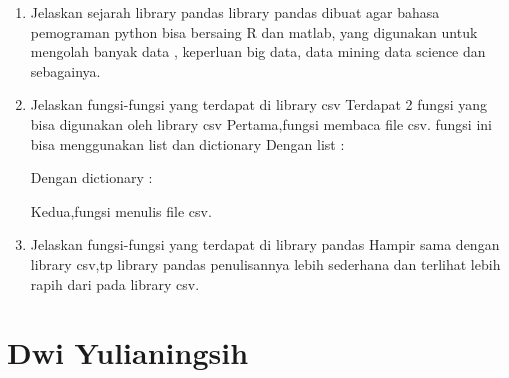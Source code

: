 \begin{enumerate}
    \item Jelaskan sejarah library pandas
    library pandas dibuat agar bahasa pemograman python bisa bersaing R dan matlab, yang digunakan untuk mengolah banyak data , keperluan big data, data mining data science dan sebagainya.
    \item Jelaskan fungsi-fungsi yang terdapat di library csv
    Terdapat 2 fungsi yang bisa digunakan oleh library csv
    Pertama,fungsi membaca file csv.
    fungsi ini bisa menggunakan list dan dictionary
    Dengan list :
    
    Dengan dictionary :
    
    Kedua,fungsi menulis file csv.
    
    \item Jelaskan fungsi-fungsi yang terdapat di library pandas
    Hampir sama dengan library csv,tp library pandas penulisannya lebih sederhana dan terlihat lebih rapih dari pada library csv.
    
\end{enumerate}

\section{Dwi Yulianingsih}
